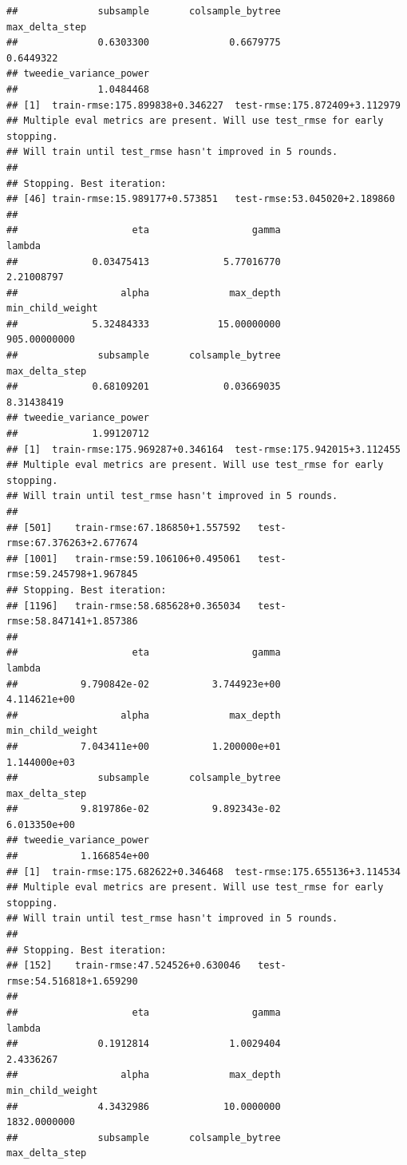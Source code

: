 \documentclass[
]{article}
\begin{document}
\begin{verbatim}
##              subsample       colsample_bytree         max_delta_step 
##              0.6303300              0.6679775              0.6449322 
## tweedie_variance_power 
##              1.0484468 
## [1]  train-rmse:175.899838+0.346227  test-rmse:175.872409+3.112979 
## Multiple eval metrics are present. Will use test_rmse for early stopping.
## Will train until test_rmse hasn't improved in 5 rounds.
## 
## Stopping. Best iteration:
## [46] train-rmse:15.989177+0.573851   test-rmse:53.045020+2.189860
## 
##                    eta                  gamma                 lambda 
##             0.03475413             5.77016770             2.21008797 
##                  alpha              max_depth       min_child_weight 
##             5.32484333            15.00000000           905.00000000 
##              subsample       colsample_bytree         max_delta_step 
##             0.68109201             0.03669035             8.31438419 
## tweedie_variance_power 
##             1.99120712 
## [1]  train-rmse:175.969287+0.346164  test-rmse:175.942015+3.112455 
## Multiple eval metrics are present. Will use test_rmse for early stopping.
## Will train until test_rmse hasn't improved in 5 rounds.
## 
## [501]    train-rmse:67.186850+1.557592   test-rmse:67.376263+2.677674 
## [1001]   train-rmse:59.106106+0.495061   test-rmse:59.245798+1.967845 
## Stopping. Best iteration:
## [1196]   train-rmse:58.685628+0.365034   test-rmse:58.847141+1.857386
## 
##                    eta                  gamma                 lambda 
##           9.790842e-02           3.744923e+00           4.114621e+00 
##                  alpha              max_depth       min_child_weight 
##           7.043411e+00           1.200000e+01           1.144000e+03 
##              subsample       colsample_bytree         max_delta_step 
##           9.819786e-02           9.892343e-02           6.013350e+00 
## tweedie_variance_power 
##           1.166854e+00 
## [1]  train-rmse:175.682622+0.346468  test-rmse:175.655136+3.114534 
## Multiple eval metrics are present. Will use test_rmse for early stopping.
## Will train until test_rmse hasn't improved in 5 rounds.
## 
## Stopping. Best iteration:
## [152]    train-rmse:47.524526+0.630046   test-rmse:54.516818+1.659290
## 
##                    eta                  gamma                 lambda 
##              0.1912814              1.0029404              2.4336267 
##                  alpha              max_depth       min_child_weight 
##              4.3432986             10.0000000           1832.0000000 
##              subsample       colsample_bytree         max_delta_step 

\end{verbatim}
\end{document}
